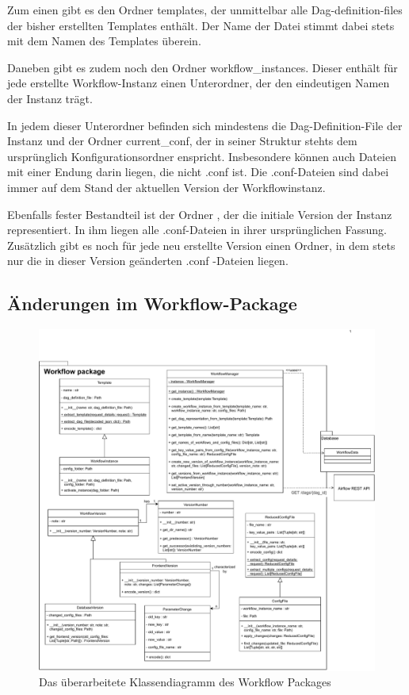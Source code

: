 Zum einen gibt es den Ordner \glqq templates\grqq{}, der unmittelbar alle Dag-definition-files der bisher erstellten Templates enthält. Der Name der Datei stimmt dabei stets mit dem Namen des Templates überein. 

Daneben gibt es zudem noch den Ordner \glqq workflow\_instances\grqq{}. Dieser enthält für jede erstellte Workflow-Instanz einen Unterordner, der den eindeutigen Namen der Instanz trägt. 

In jedem dieser Unterordner befinden sich mindestens die Dag-Definition-File der Instanz und der Ordner \glqq current\_conf\grqq{}, der in seiner Struktur stehts dem ursprünglich Konfigurationsordner enspricht. Insbesondere können auch Dateien mit einer Endung darin liegen, die nicht \glqq.conf\grqq{} ist. Die \glqq .conf\grqq{}-Dateien sind dabei immer auf dem Stand der aktuellen Version der Workflowinstanz. 

Ebenfalls fester Bestandteil ist der Ordner \grqq{}, der die initiale Version der Instanz representiert. In ihm liegen alle \glqq.conf\grqq{}-Dateien in ihrer ursprünglichen Fassung. Zusätzlich gibt es noch für jede neu erstellte Version einen Ordner, in dem stets nur die in dieser Version geänderten \glqq.conf \grqq{}-Dateien liegen.

\subsection{Änderungen im Workflow-Package}

\begin{figure}[h]
            \label{workflow_klassen}
            \centerline{\includegraphics[scale=0.5]{res/workflow_class_diag.pdf}}
            \caption{Das überarbeitete Klassendiagramm des Workflow Packages}
\end{figure}

